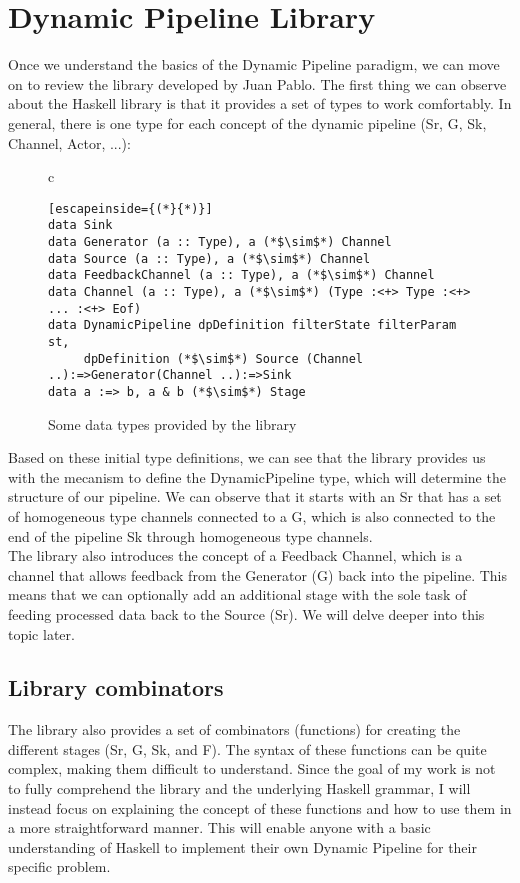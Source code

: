 \section{Dynamic Pipeline Library}
Once we understand the basics of the Dynamic Pipeline paradigm, we can move on to review the library developed by Juan Pablo.
The first thing we can observe about the Haskell library is that it provides a set of types to work comfortably.
In general, there is one type for each concept of the dynamic pipeline (Sr, G, Sk, Channel, Actor, ...):

\begin{figure}[H]
    \centering
    \begin{tabular}{c}
        \begin{lstlisting}[escapeinside={(*}{*)}]
data Sink
data Generator (a :: Type), a (*$\sim$*) Channel
data Source (a :: Type), a (*$\sim$*) Channel
data FeedbackChannel (a :: Type), a (*$\sim$*) Channel
data Channel (a :: Type), a (*$\sim$*) (Type :<+> Type :<+> ... :<+> Eof)
data DynamicPipeline dpDefinition filterState filterParam st, 
     dpDefinition (*$\sim$*) Source (Channel ..):=>Generator(Channel ..):=>Sink
data a :=> b, a & b (*$\sim$*) Stage
        \end{lstlisting}
    \end{tabular}
    \caption{Some data types provided by the library}
    \label{fig:HC1}
\end{figure}

Based on these initial type definitions, we can see that the library provides us with the mecanism to define the DynamicPipeline type, which will determine the structure of our pipeline.
We can observe that it starts with an Sr that has a set of homogeneous type channels connected to a G, which is also connected to the end of the pipeline Sk through homogeneous type channels. \\

The library also introduces the concept of a Feedback Channel, which is a channel that allows feedback from the Generator (G) back into the pipeline.
This means that we can optionally add an additional stage with the sole task of feeding processed data back to the Source (Sr).
We will delve deeper into this topic later.

\subsection{Library combinators}
The library also provides a set of combinators (functions) for creating the different stages (Sr, G, Sk, and F).
The syntax of these functions can be quite complex, making them difficult to understand.
Since the goal of my work is not to fully comprehend the library and the underlying Haskell grammar, I will instead focus on explaining the concept of these functions and how to use them in a more straightforward manner.
This will enable anyone with a basic understanding of Haskell to implement their own Dynamic Pipeline for their specific problem.

